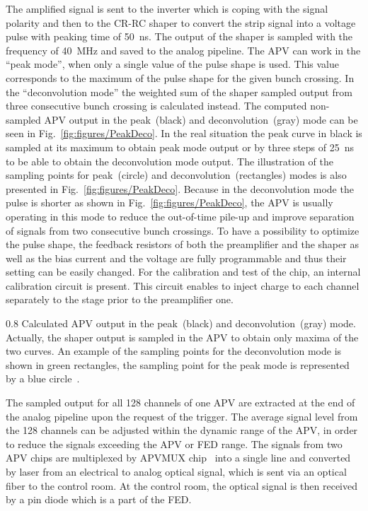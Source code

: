 The amplified signal is sent to the inverter which is coping with the signal polarity and then to the CR-RC shaper to convert the strip signal into a voltage pulse with peaking time of 50~ns. The output of the shaper is sampled with the frequency of 40~MHz and saved to the analog pipeline. The APV can work in the ``peak mode'', when only a single value of the pulse shape is used. This value corresponds to the maximum of the pulse shape for the given bunch crossing. In the ``deconvolution mode'' the weighted sum of the shaper sampled output from three consecutive bunch crossing is calculated instead. The computed non-sampled APV output in the peak~(black) and deconvolution~(gray) mode can be seen in Fig.~\ref{fig:figures/PeakDeco}. In the real situation the peak curve in black is sampled at its maximum to obtain peak mode output or by three steps of 25~ns to be able to obtain the deconvolution mode output. The illustration of the sampling points for peak~(circle) and deconvolution~(rectangles) modes is also presented in Fig.~\ref{fig:figures/PeakDeco}. Because in the deconvolution mode the pulse is shorter as shown in Fig.~\ref{fig:figures/PeakDeco}, the APV is usually operating in this mode to reduce the out-of-time pile-up and improve separation of signals from two consecutive bunch crossings. To have a possibility to optimize the pulse shape, the feedback resistors of both the preamplifier and the shaper as well as the bias current and the voltage are fully programmable and thus their setting can be easily changed. For the calibration and test of the chip, an internal calibration circuit is present. This circuit enables to inject charge to each channel separately to the stage prior to the preamplifier one.


                 {0.8}       %
                 {Calculated APV output in the peak~(black) and deconvolution~(gray) mode. Actually, the shaper output is sampled in the APV to obtain only maxima of the two curves. An example of the sampling points for the deconvolution mode is shown in green rectangles, the sampling point for the peak mode is represented by a blue circle~\cite{Friedl:2001kra}.} %


The sampled output for all 128 channels of one APV are extracted at the end of the analog pipeline upon the request of the trigger. The average signal level from the 128 channels can be adjusted within the dynamic range of the APV, in order to reduce the signals exceeding the APV or FED range. The signals from two APV chips are multiplexed by APVMUX chip~\cite{Ball:2007zza} into a single line and converted by laser from an electrical to analog optical signal, which is sent via an optical fiber to the control room. At the control room, the optical signal is then received by a pin diode which is a part of the FED.

